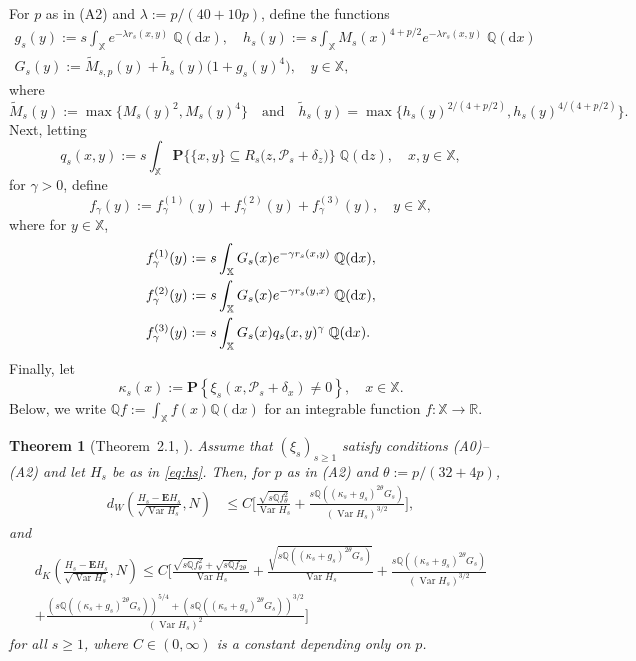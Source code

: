 \documentclass[11pt,reqno]{amsart}
\numberwithin{equation}{section}
\newtheorem{theorem}{Theorem}[section]
\theoremstyle{definition}
\newcommand{\E}{\mathbf{E}}
\newcommand{\R}{\mathbb{R}}
\newcommand{\sP}{\mathcal{P}}
\renewcommand{\P}{\mathbf{P}}
\newcommand{\Prob}[1]{\mathbf P\left\{#1\right\}}
\newcommand{\XX}{\mathbb{X}}
\newcommand{\QQ}{\mathbb{Q}}
\newcommand{\ldiff}{{\mathrm d}}
\DeclareMathOperator{\Var}{Var}
\begin{document}
For $p$ as in (A2) and $\lambda:=p/(40+10p)$, define the functions
\begin{gather}
\label{eq:g}
g_{s}(y) :=s \int_{\XX} e^{-\lambda r_{s}(x, y)} \;\QQ(\ldiff x), \quad h_s(y) :=s \int_{\XX} M_{s}(x)^{4+p/2}e^{-\lambda r_{s}(x, y)} \;\QQ(\ldiff x)\\ 
\label{eq:g5}
G_s(y) := \widetilde{M}_{s,p}(y) +
\tilde h_s(y)\big(1+g_s(y)^4\big), \quad y\in\XX,
\end{gather}
where 
$$
\widetilde{M}_{s}(y):=\max\{M_{s}(y)^2,M_{s}(y)^4\} \quad \text{and} \quad \tilde h_s(y)=\max\{h_s(y)^{2/(4+p/2)}, h_s(y)^{4/(4+p/2)}\}.
$$ Next, letting
\begin{equation}
\label{eq:g2s}
q_{s}(x,y):=s \int_\XX \P\Big\{\{x,y\} 
\subseteq R_s\big(z, \sP_s +\delta_z\big)\Big\} \;\QQ(\ldiff z), \quad x,y \in \XX,
\end{equation} 
for
$\gamma>0$, define
\begin{equation}
\label{eq:fa}
f_\gamma(y):=f_\gamma^{(1)}(y)+f_\gamma^{(2)}(y)+f_\gamma^{(3)}(y),
\quad y\in\XX,
\end{equation}
where for $y \in \XX$,
\begin{align}
\label{eq:fal}
f_\gamma^{(1)}(y)&:=s \int_\XX G_s(x) e^{- \gamma r_{s}(x,y)}
\;\QQ(\ldiff x), \notag \\
f_\gamma^{(2)} (y)&:=s \int_\XX G_s(x) e^{- \gamma r_{s}(y,x)} 
\;\QQ(\ldiff x), \nonumber\\
f_\gamma^{(3)}(y)&:=s \int_{\XX} G_s(x) q_{s}(x,y)^\gamma \;\QQ(\ldiff x).
\end{align}
Finally, let
\begin{equation}
\label{eq:p}
\kappa_s(x):= \Prob{\xi_{s}(x, \sP_{s}+\delta_x) \neq 0},\quad
x\in\XX. 
\end{equation}
Below, we write $\QQ f:=\int_\XX f(x) \QQ(\ldiff x)$ for an integrable function $f : \XX \to \R$.


\begin{theorem}[Theorem~2.1, \cite{BM21}]\label{thm:KolBd}
	Assume that $(\xi_s)_{s \ge 1}$ satisfy conditions (A0)--(A2) and
	let $H_s$ be as in \eqref{eq:hs}. Then, for $p$ as in (A2) and
	$\theta:=p /(32+4 p)$, 
	\begin{align*}
	d_{W}\left(\frac{H_s-\E H_s}{\sqrt{\Var H_s}},  N\right) 
	&\leq C \Bigg[\frac{\sqrt{s  \QQ f_\theta^2}}{\Var H_s}
	+\frac{ s\QQ ((\kappa_s+g_{s})^{2\theta}G_s)}{(\Var H_s)^{3/2}}\Bigg],
	\end{align*}
	and
	\begin{multline*}
	d_{K}\left(\frac{H_s-\E H_s}{\sqrt{\Var H_s}},
	N\right) 
	\leq C \Bigg[\frac{\sqrt{s  \QQ f_\theta^2}
		+ \sqrt{s  \QQ f_{2\theta}}}{\Var H_s}
	+\frac{\sqrt{ s\QQ ((\kappa_s+g_{s})^{2\theta}G_s)}}{\Var H_s}
	+\frac{ s\QQ ((\kappa_s+g_{s})^{2\theta} G_s)}{(\Var H_s)^{3/2}}\\
	 +\frac{( s\QQ ((\kappa_s+g_{s})^{2\theta} G_s))^{5/4}
		+ ( s\QQ ((\kappa_s+g_{s})^{2\theta} G_s))^{3/2}}{(\Var H_s)^{2}}\Bigg]
	\end{multline*}
	for all $s\geq1$, where
	$C \in (0,\infty)$ is a constant depending only on $p$.
\end{theorem} 
\end{document}
